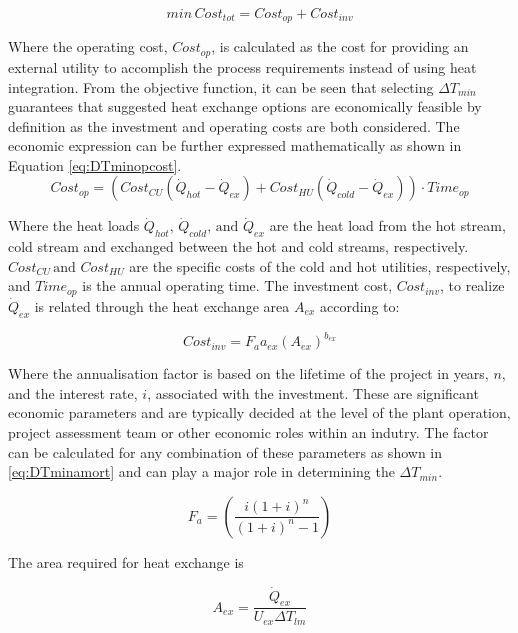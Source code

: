\begin{equation}\label{eq:DTminobj}
min \, Cost_{tot}= Cost_{op}+Cost_{inv}
\end{equation}

Where the operating cost, $Cost_{op}$, is calculated as the cost for providing an external utility to accomplish the process requirements instead of using heat integration. From the objective function, it can be seen that selecting $\Delta T_{min}$ guarantees that suggested heat exchange options are economically feasible by definition as the investment and operating costs are both considered. The economic expression can be further expressed mathematically as shown in Equation \ref{eq:DTminopcost}.
\begin{equation}\label{eq:DTminopcost}
Cost_{op}=\left(Cost_{CU} (\dot Q_{hot}-\dot Q_{ex})+ Cost_{HU} (\dot Q_{cold}-\dot Q_{ex})\right) \cdot Time_{op}
\end{equation}

Where the heat loads $\dot Q_{hot},\, \dot Q_{cold}, \, \text{and }\dot Q_{ex}$ are the heat load from the hot stream, cold stream and exchanged between the hot and cold streams, respectively. $Cost_{CU} \, \text{and } Cost_{HU}$ are the specific costs of the cold and hot utilities, respectively, and $Time_{op}$ is the annual operating time. The investment cost, $Cost_{inv}$, to realize $\dot Q_{ex}$ is related through the heat exchange area $A_{ex}$ according to:

\begin{equation}\label{eq:DTmininvcost}
Cost_{inv}=F_a a_{ex}(A_{ex})^{b_{ex}}
\end{equation}

Where the annualisation factor is based on the lifetime of the project in years, $n$, and the interest rate, $i$, associated with the investment. These are significant economic parameters and are typically decided at the level of the plant operation, project assessment team or other economic roles within an indutry. The factor can be calculated for any combination of these parameters as shown in \ref{eq:DTminamort} and can play a major role in determining the $\Delta T_{min}$.

\begin{equation}\label{eq:DTminamort}
F_a=\left(\frac{i(1+i)^n}{(1+i)^n-1}\right)
\end{equation}

The area required for heat exchange is

\begin{equation}\label{eq:DTminarea}
A_{ex}=\frac{\dot Q_{ex}}{U_{ex}\Delta T_{lm}}
\end{equation}


